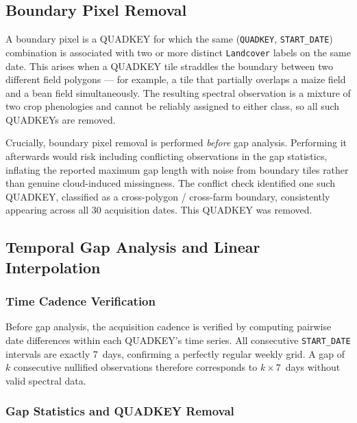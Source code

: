 \subsection{Boundary Pixel Removal}
\label{subsec:boundary}

A boundary pixel is a QUADKEY for which the same (\texttt{QUADKEY},
\texttt{START\_DATE}) combination is associated with two or more distinct
\texttt{Landcover} labels on the same date. This arises when a QUADKEY
tile straddles the boundary between two different field polygons — for
example, a tile that partially overlaps a maize field and a bean field
simultaneously. The resulting spectral observation is a mixture of two
crop phenologies and cannot be reliably assigned to either class, so all
such QUADKEYs are removed.

Crucially, boundary pixel removal is performed \emph{before} gap analysis.
Performing it afterwards would risk including conflicting observations in
the gap statistics, inflating the reported maximum gap length with noise
from boundary tiles rather than genuine cloud-induced missingness.
The conflict check identified one such QUADKEY, classified as a
cross-polygon / cross-farm boundary, consistently appearing across all
30 acquisition dates. This QUADKEY was removed.


\subsection{Temporal Gap Analysis and Linear Interpolation}
\label{subsec:interpolation}

\subsubsection{Time Cadence Verification}
\label{subsubsec:cadence}

Before gap analysis, the acquisition cadence is verified by computing
pairwise date differences within each QUADKEY's time series. All
consecutive \texttt{START\_DATE} intervals are exactly 7~days, confirming
a perfectly regular weekly grid. A gap of $k$ consecutive nullified
observations therefore corresponds to $k \times 7$~days without valid
spectral data.

\subsubsection{Gap Statistics and QUADKEY Removal}
\label{subsubsec:gap}


